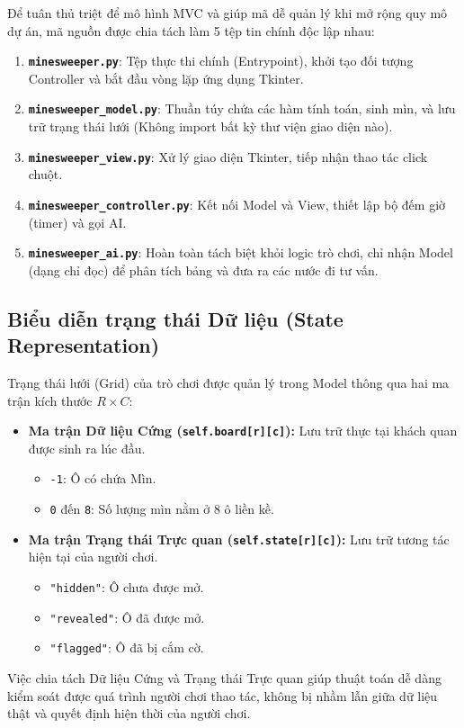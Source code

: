 Để tuân thủ triệt để mô hình MVC và giúp mã dễ quản lý khi mở rộng quy mô dự án, mã nguồn được chia tách làm 5 tệp tin chính độc lập nhau:
\begin{enumerate}
    \item \textbf{\texttt{minesweeper.py}}: Tệp thực thi chính (Entrypoint), khởi tạo đối tượng Controller và bắt đầu vòng lặp ứng dụng Tkinter.
    \item \textbf{\texttt{minesweeper\_model.py}}: Thuần túy chứa các hàm tính toán, sinh mìn, và lưu trữ trạng thái lưới (Không import bất kỳ thư viện giao diện nào).
    \item \textbf{\texttt{minesweeper\_view.py}}: Xử lý giao diện Tkinter, tiếp nhận thao tác click chuột.
    \item \textbf{\texttt{minesweeper\_controller.py}}: Kết nối Model và View, thiết lập bộ đếm giờ (timer) và gọi AI.
    \item \textbf{\texttt{minesweeper\_ai.py}}: Hoàn toàn tách biệt khỏi logic trò chơi, chỉ nhận Model (dạng chỉ đọc) để phân tích bảng và đưa ra các nước đi tư vấn.
\end{enumerate}

\subsection{Biểu diễn trạng thái Dữ liệu (State Representation)}

Trạng thái lưới (Grid) của trò chơi được quản lý trong Model thông qua hai ma trận kích thước $R \times C$:
\begin{itemize}
    \item \textbf{Ma trận Dữ liệu Cứng (\texttt{self.board[r][c]}):} Lưu trữ thực tại khách quan được sinh ra lúc đầu.
    \begin{itemize}
        \item \texttt{-1}: Ô có chứa Mìn.
        \item \texttt{0} đến \texttt{8}: Số lượng mìn nằm ở 8 ô liền kề.
    \end{itemize}
    \item \textbf{Ma trận Trạng thái Trực quan (\texttt{self.state[r][c]}):} Lưu trữ tương tác hiện tại của người chơi.
    \begin{itemize}
        \item \texttt{"hidden"}: Ô chưa được mở.
        \item \texttt{"revealed"}: Ô đã được mở.
        \item \texttt{"flagged"}: Ô đã bị cắm cờ.
    \end{itemize}
\end{itemize}
Việc chia tách Dữ liệu Cứng và Trạng thái Trực quan giúp thuật toán dễ dàng kiểm soát được quá trình người chơi thao tác, không bị nhầm lẫn giữa dữ liệu thật và quyết định hiện thời của người chơi.

